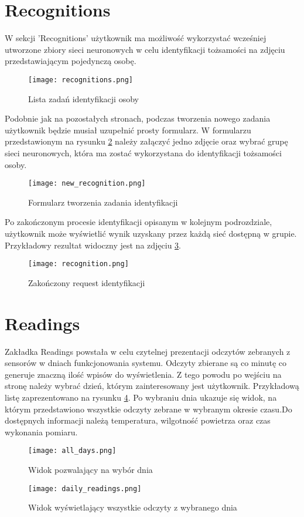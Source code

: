\section{Recognitions}
W sekcji 'Recognitions' użytkownik ma możliwość wykorzystać wcześniej utworzone zbiory sieci neuronowych w celu identyfikacji tożsamości na zdjęciu przedstawiającym pojedynczą osobę.
\begin{figure}[H]
	\centering
	\texttt{[image: recognitions.png]}
	\caption{Lista zadań identyfikacji osoby}
	\label{fig:recognitions}
\end{figure}
Podobnie jak na pozostałych stronach, podczas tworzenia nowego zadania użytkownik będzie musiał uzupełnić prosty formularz. W formularzu przedstawionym na rysunku \ref{fig:new_recognition} należy załączyć jedno zdjęcie oraz wybrać grupę sieci neuronowych, która ma zostać wykorzystana do identyfikacji tożsamości osoby.
\begin{figure}[H]
	\centering
	\texttt{[image: new\_recognition.png]}
	\caption{Formularz tworzenia zadania identyfikacji}
	\label{fig:new_recognition}
\end{figure}
Po zakończonym procesie identyfikacji opisanym w kolejnym podrozdziale, użytkownik może wyświetlić wynik uzyskany przez każdą sieć dostępną w grupie. Przykładowy rezultat widoczny jest na zdjęciu \ref{fig:recognition}.
\begin{figure}[H]
	\centering
	\texttt{[image: recognition.png]}
	\caption{Zakończony request identyfikacji}
	\label{fig:recognition}
\end{figure}

\section{Readings}
Zakładka Readings powstała w celu czytelnej prezentacji odczytów zebranych z sensorów w dniach funkcjonowania systemu. Odczyty zbierane są co minutę co generuje znaczną ilość wpisów do wyświetlenia. Z tego powodu po wejściu na stronę należy wybrać dzień, którym zainteresowany jest użytkownik. Przykładową listę zaprezentowano na rysunku \ref{fig:all_days}. Po wybraniu dnia ukazuje się widok, na którym przedstawiono wszystkie odczyty zebrane w wybranym okresie czasu.Do dostępnych informacji należą temperatura, wilgotność powietrza oraz czas wykonania pomiaru.
\begin{figure}[H]
	\centering
	\texttt{[image: all\_days.png]}
	\caption{Widok pozwalający na wybór dnia}
	\label{fig:all_days}
\end{figure}
\begin{figure}[H]
	\centering
	\texttt{[image: daily\_readings.png]}
	\caption{Widok wyświetlający wszystkie odczyty z wybranego dnia}
	\label{fig:daily_readings}
\end{figure}

